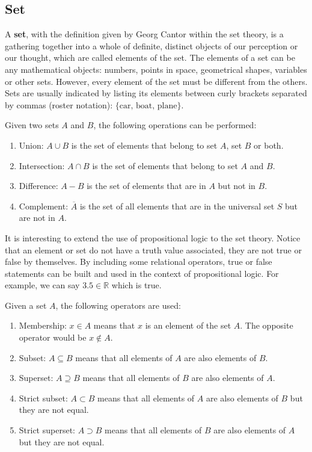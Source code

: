         \subsection*{Set}
\vspace{-0.5cm}
A \textbf{set}, with the definition given by Georg Cantor within the set theory, 
is a gathering together into a whole of definite, distinct objects of our perception or our thought, 
which are called elements of the set.
The elements of a set can be any mathematical objects: numbers, points in space, geometrical shapes, variables or other sets.
However, every element of the set must be different from the others.
Sets are usually indicated by listing its elements between curly brackets separated by commas (roster notation): $\{\textrm{car, boat, plane}\}$.

Given two sets $A$ and $B$, the following operations can be performed:
\begin{enumerate}[noitemsep]
    \item Union: $A\cup B$ is the set of elements that belong to set $A$, set $B$ or both.
    \item Intersection: $A\cap B$ is the set of elements that belong to set $A$ and $B$.
    \item Difference: $A - B$ is the set of elements that are in $A$ but not in $B$.
    \item Complement: $\overline{A}$ is the set of all elements that are in the universal set $S$ but are not in $A$.
\end{enumerate}
It is interesting to extend the use of propositional logic to the set theory. 
Notice that an element or set do not have a truth value associated, they are not true or false by themselves. 
By including some relational operators, true or false statements can be 
built and used in the context of propositional logic. 
For example, we can say $3.5 \in \mathbb{R}$ which is true. 

\newpage
Given a set $A$, the following operators are used:
\vspace{-.5cm}
\begin{enumerate}[noitemsep]
    \item Membership: $x\in A$ means that $x$ is an element of the set $A$. The opposite operator would be $x\notin A$.
    \item Subset: $A \subseteq B$ means that all elements of $A$ are also elements of $B$.
    \item Superset: $A \supseteq B$ means that all elements of $B$ are also elements of $A$.
    \item Strict subset: $A \subset B$ means that all elements of $A$ are also elements of $B$ but they are not equal.
    \item Strict superset: $A \supset B$ means that all elements of $B$ are also elements of $A$ but they are not equal.
\end{enumerate}
\vspace{-.5cm}

